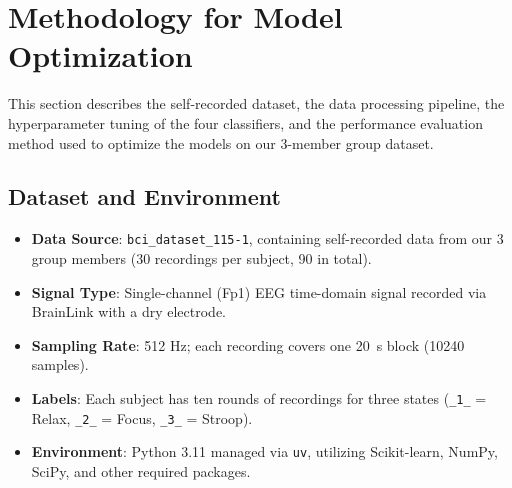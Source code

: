 \section{Methodology for Model Optimization}\label{sec:method}

This section describes the self-recorded dataset, the data processing pipeline, the hyperparameter tuning of the four classifiers, and the performance evaluation method used to optimize the models on our 3-member group dataset.

\subsection{Dataset and Environment}
\begin{itemize}[leftmargin=*]
    \item \textbf{Data Source}: \texttt{bci\_dataset\_115-1}, containing self-recorded data from our 3 group members (30 recordings per subject, 90 in total).
    \item \textbf{Signal Type}: Single-channel (Fp1) EEG time-domain signal recorded via BrainLink with a dry electrode.
    \item \textbf{Sampling Rate}: 512 Hz; each recording covers one 20~s block (10240 samples).
    \item \textbf{Labels}: Each subject has ten rounds of recordings for three states (\texttt{\_1\_} = Relax, \texttt{\_2\_} = Focus, \texttt{\_3\_} = Stroop).
    \item \textbf{Environment}: Python 3.11 managed via \texttt{uv}, utilizing Scikit-learn, NumPy, SciPy, and other required packages.
\end{itemize}

